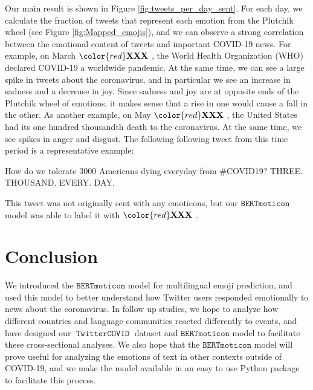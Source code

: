 \documentclass[11pt]{article}
\newcommand{\XXX}{{\color{red}\textbf{XXX}}~}
\newcommand{\bertmoji}{\texttt{BERTmoticon}}
\DeclareMathOperator{\emoticon}{\texttt{TwitterEmoticon}}
\DeclareMathOperator{\corona}{\texttt{TwitterCOVID}}
\begin{document}
Our main result is shown in Figure \ref{fig:tweets_per_day_sent}.
For each day, we calculate the fraction of tweets that represent each emotion from the Plutchik wheel (see Figure \ref{fig:Mapped_emojis}),
and we can observe a strong correlation between the emotional content of tweets and important COVID-19 news.
For example, on March $\XXX$, the World Health Organization (WHO) declared COVID-19 a worldwide pandemic.
At the same time, we can see a large spike in tweets about the coronavirus,
and in particular we see an increase in sadness and a decrease in joy.
Since sadness and joy are at opposite ends of the Plutchik wheel of emotions,
it makes sense that a rise in one would cause a fall in the other.
As another example, on May $\XXX$, the United States had its one hundred thousandth death to the coronavirus.
At the same time, we see spikes in anger and disgust.
The following following tweet from this time period is a representative example:
\begin{displayquote}
    How do we tolerate 3000 Americans dying everyday from \#COVID19? THREE. THOUSAND. EVERY. DAY.
\end{displayquote}
This tweet was not originally sent with any emoticons,
but our $\bertmoji$ model was able to label it with $\XXX$.


\section{Conclusion}

We introduced the $\bertmoji$ model for multilingual emoji prediction,
and used this model to better understand how Twitter users responded emotionally to news about the coronavirus.
In follow up studies, we hope to analyze how different countries and language communities reacted differently to events,
and have designed our $\corona$ dataset and $\bertmoji$ model to facilitate these cross-sectional analyses.
We also hope that the $\bertmoji$ model will prove useful for analyzing the emotions of text in other contexts outside of COVID-19,
and we make the model available in an easy to use Python package to facilitate this process.
\end{document}
